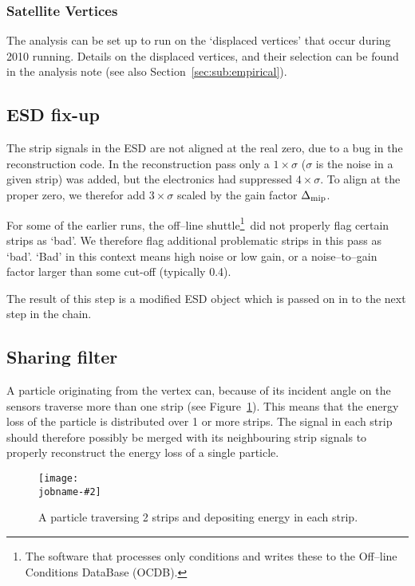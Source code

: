\documentclass[compat,11pt]{alicenote}
\DeclareRobustCommand{\AlwaysText}[1]{\ifmmode\relax\text{#1}\else #1\fi}
\newcommand*\ESD{\AlwaysText{ESD}}
\newcommand{\secref}[1]{Section~\ref{#1}}
\newcommand{\figref}[1]{Figure~\ref{#1}}
\newcommand{\DeltaMip}{\ensuremath\Delta_{\text{mip}}}
\newcommand\figinput[2][\textwidth]{%
  \texttt{[image: \\jobname-\#2]}}
\begin{document}
\subsubsection{Satellite Vertices}
\label{sec:sub:sub:dispvtx}

The analysis can be set up to run on the `displaced vertices' that
occur during \LHC{} 2010 \PbPbCol{} running. Details on the displaced
vertices, and their selection can be found in the \VZERO{} analysis note
\cite{maxime} (see also \secref{sec:sub:empirical}).

\subsection{\ESD{} fix-up}
\label{sec:sub:fixer} 

The \FMD{} strip signals in the \ESD{} are not aligned at the real zero,
due to a bug in the reconstruction code.  In the reconstruction pass
only a $1\times\sigma$ ($\sigma$ is the noise in a given strip) was
added, but the electronics had suppressed $4\times\sigma$.  To align
at the proper zero, we therefor add $3\times\sigma$ scaled by the gain
factor $\DeltaMip$.

For some of the earlier runs, the off--line shuttle\footnote{The
  software that processes only conditions and writes these to the
  Off--line Conditions DataBase (OCDB).}\ did not properly flag certain
strips as `bad'.  We therefore flag additional problematic strips in
this pass as `bad'.  `Bad' in this context means high noise or low
gain, or a noise--to--gain factor larger than some cut-off (typically
0.4). 

The result of this step is a modified \ESD{} object which is passed on
in to the next step in the chain. 


\subsection{Sharing filter}
\label{sec:sub:sharing_filter}

A particle originating from the vertex can, because of its incident
angle on the \FMD{} sensors traverse more than one strip (see
\figref{fig:share_fraction}).  This means that the energy loss of the
particle is distributed over 1 or more strips.  The signal in each
strip should therefore possibly be merged with its neighbouring strip
signals to properly reconstruct the energy loss of a single particle.

\begin{figure}[htbp]
  \centering
  \figinput[3cm]{share_fraction}
  \caption{A particle traversing 2 strips and depositing energy in
    each strip. }
  \label{fig:share_fraction}
\end{figure}
\end{document}

